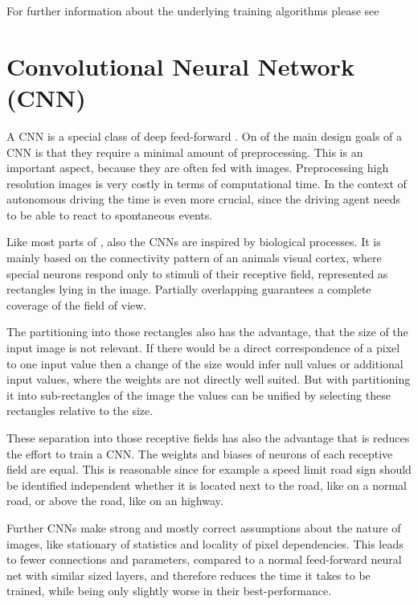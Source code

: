 For further information about the underlying training algorithms please see %


\section{Convolutional Neural Network (CNN)}\label{sec:CNN}

A CNN is a special class of deep feed-forward \nns. On of the main design goals of a CNN is that they require a minimal amount of preprocessing. This is an important aspect, because they are often fed with images. Preprocessing high resolution images is very costly in terms of computational time. In the context of autonomous driving the time is even more crucial, since the driving agent needs to be able to react to spontaneous events.

Like most parts of \nns, also the CNNs are inspired by biological processes. It is mainly based on the connectivity pattern of an animals visual cortex, where special neurons respond only to stimuli of their receptive field, represented as rectangles lying in the image. Partially overlapping guarantees a complete coverage of the field of view. \cite{wiki:CNN}

The partitioning into those rectangles also has the advantage, that the size of the input image is not relevant. If there would be a direct correspondence of a pixel to one input value then a change of the size would infer null values or additional input values, where the weights are not directly well suited. But with partitioning it into sub-rectangles of the image the values can be unified by selecting these rectangles relative to the size. %

These separation into those receptive fields has also the advantage that is reduces the effort to train a CNN. The weights and biases of neurons of each receptive field are equal. This is reasonable since for example a speed limit road sign should be identified independent whether it is located next to the road, like on a normal road, or above the road, like on an highway. %

Further CNNs make strong and mostly correct assumptions about the nature of images, like stationary of statistics and locality of pixel dependencies. This leads to fewer connections and parameters, compared to a normal feed-forward neural net with similar sized layers, and therefore reduces the time it takes to be trained, while being only slightly worse in their best-performance. \cite{krizhevsky2012imagenet}


